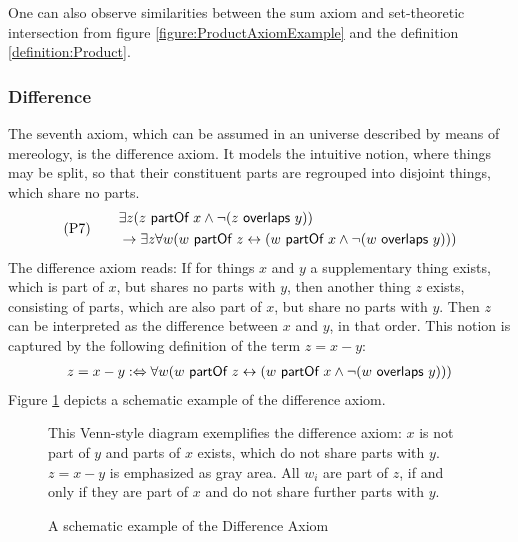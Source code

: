 One can also observe similarities between the sum axiom and set-theoretic intersection from figure \ref{figure:ProductAxiomExample} and the definition \ref{definition:Product}.

\subsubsection{Difference}
The seventh axiom, which can be assumed in an universe described by means of mereology, is the difference axiom.
It models the intuitive notion, where things may be split, so that their constituent parts are regrouped into disjoint things, which share no parts.
\begin{align}
&\text{(P7)}
\quad
&\begin{split}
&\exists z (z ~\textsf{partOf}~ x \wedge \neg(z ~\textsf{overlaps}~ y))
\\&\rightarrow
\exists z \forall w (w ~\textsf{partOf}~ z \leftrightarrow (w ~\textsf{partOf}~ x \wedge \neg(w ~\textsf{overlaps}~ y)))
\end{split}
\label{axiom:Difference}
\end{align}
The difference axiom reads:
If for things $x$ and $y$ a supplementary thing exists, which is part of $x$, but shares no parts with $y$, then another thing $z$ exists, consisting of parts, which are also part of $x$, but share no parts with $y$.
Then $z$ can be interpreted as the difference between $x$ and $y$, in that order.
This notion is captured by the following definition of the term $z = x - y$:
\begin{align}
z = x - y
:\Leftrightarrow
\forall w (w ~\textsf{partOf}~ z \leftrightarrow (w ~\textsf{partOf}~ x \wedge \neg(w ~\textsf{overlaps}~ y)))
\label{definition:Difference}
\end{align}
Figure \ref{figure:DifferenceAxiomExample} depicts a schematic example of the difference axiom.

\begin{figure}[h!]
\begin{center}
\end{center}
{
\scriptsize 
This Venn-style diagram exemplifies the difference axiom:
$x$ is not part of $y$ and parts of $x$ exists, which do not share parts with $y$.
$z = x - y$ is emphasized as gray area.
All $w_i$ are part of $z$, if and only if they are part of $x$ and do not share further parts with $y$.
}
\caption{A schematic example of the Difference Axiom}
\label{figure:DifferenceAxiomExample}
\end{figure}

